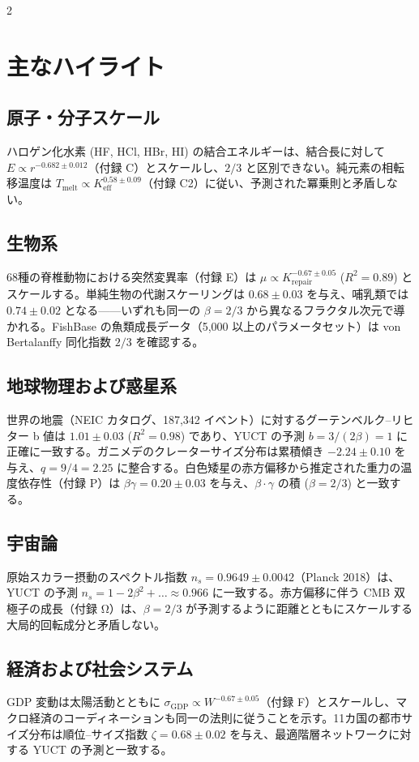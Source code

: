 \documentclass[11pt,a4paper]{article}
\newcommand{\betaf}{\beta}
\begin{document}
\begin{multicols}{2}
		\section{主なハイライト}
		
		\subsection{原子・分子スケール}
		ハロゲン化水素 (HF, HCl, HBr, HI) の結合エネルギーは、結合長に対して \(E \propto r^{-0.682\pm0.012}\)（付録 C）とスケールし、\(2/3\) と区別できない。純元素の相転移温度は \(T_{\text{melt}} \propto K_{\mathrm{eff}}^{0.58\pm0.09}\)（付録 C2）に従い、予測された冪乗則と矛盾しない。
		
		\subsection{生物系}
		68種の脊椎動物における突然変異率（付録 E）は \(\mu \propto K_{\mathrm{repair}}^{-0.67\pm0.05}\) (\(R^2=0.89\)) とスケールする。単純生物の代謝スケーリングは \(0.68\pm0.03\) を与え、哺乳類では \(0.74\pm0.02\) となる——いずれも同一の \(\betaf = 2/3\) から異なるフラクタル次元で導かれる。FishBase の魚類成長データ（5,000 以上のパラメータセット）は von Bertalanffy 同化指数 \(2/3\) を確認する。
		
		\subsection{地球物理および惑星系}
		世界の地震（NEIC カタログ、187,342 イベント）に対するグーテンベルク--リヒター b 値は \(1.01\pm0.03\) (\(R^2=0.98\)) であり、YUCT の予測 \(b = 3/(2\betaf) = 1\) に正確に一致する。ガニメデのクレーターサイズ分布は累積傾き \(-2.24\pm0.10\) を与え、\(q = 9/4 = 2.25\) に整合する。白色矮星の赤方偏移から推定された重力の温度依存性（付録 P）は \(\beta\gamma = 0.20 \pm 0.03\) を与え、\(\betaf \cdot \gamma\) の積 (\(\betaf = 2/3\)) と一致する。
		
		\subsection{宇宙論}
		原始スカラー摂動のスペクトル指数 \(n_s = 0.9649\pm0.0042\)（Planck 2018）は、YUCT の予測 \(n_s = 1 - 2\betaf^2 + \dots \approx 0.966\) に一致する。赤方偏移に伴う CMB 双極子の成長（付録 Ω）は、\(\betaf = 2/3\) が予測するように距離とともにスケールする大局的回転成分と矛盾しない。
		
		\subsection{経済および社会システム}
		GDP 変動は太陽活動とともに \(\sigma_{\text{GDP}} \propto W^{-0.67\pm0.05}\)（付録 F）とスケールし、マクロ経済のコーディネーションも同一の法則に従うことを示す。11カ国の都市サイズ分布は順位--サイズ指数 \(\zeta = 0.68\pm0.02\) を与え、最適階層ネットワークに対する YUCT の予測と一致する。
		

\end{multicols}
\end{document}
